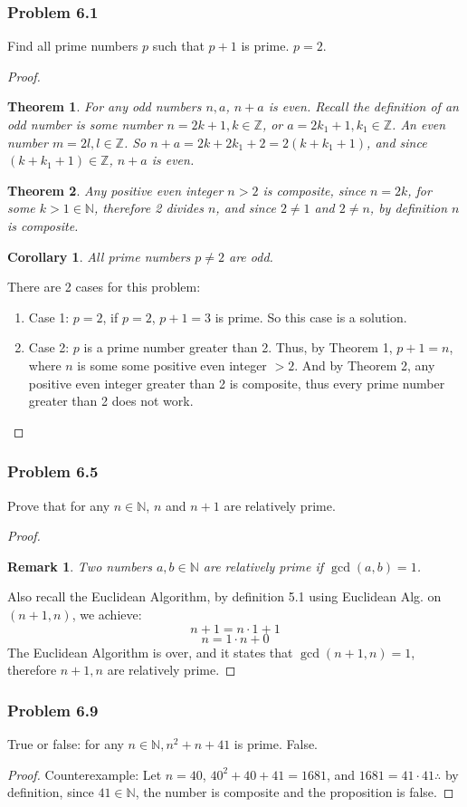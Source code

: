 \documentclass[hidelinks,12pt]{article}
\newtheorem{theorem}{Theorem}
\newtheorem{corollary}{Corollary}[theorem]
\newtheorem*{remark}{Remark}
\newcommand{\N}{\mathbb{N}}
\newcommand{\Z}{\mathbb{Z}}
\begin{document}
\subsubsection{Problem 6.1}
Find all prime numbers $p$ such that $p+1$ is prime.
\newline $p=2$.
\begin{proof}
\begin{theorem}
For any odd numbers $n,a$, $n+a$ is even. Recall the definition of an odd number is some number $n=2k+1,k\in\Z$, or $a=2k_1+1,k_1\in\Z$. An even number $m=2l,l\in\Z$. So $n+a=2k+2k_1+2=2(k+k_1+1)$, and since $(k+k_1+1)\in\Z$, $n+a$ is even.
\end{theorem}
\begin{theorem}
\label{thm2}
Any positive even integer $n>2$ is composite, since $n=2k$, for some $k>1\in\N$, therefore 2 divides $n$, and since $2\neq1$ and $2\neq n$, by definition $n$ is composite.
\end{theorem}
\begin{corollary}
All prime numbers $p\neq2$ are odd.
\end{corollary}
There are 2 cases for this problem:
\begin{enumerate}
    \item Case 1: $p=2$, if $p=2$, $p+1=3$ is prime. So this case is a solution.
    \item Case 2: $p$ is a prime number greater than 2. Thus, by Theorem 1, $p+1=n$, where $n$ is some some positive even integer $>2$. And by Theorem 2, any positive even integer greater than 2 is composite, thus every prime number greater than 2 does not work.
\end{enumerate}
\end{proof}
\subsubsection{Problem 6.5}
Prove that for any $n\in\N$, $n$ and $n+1$ are relatively prime.
\begin{proof}
\begin{remark}Two numbers $a,b\in\N$ are relatively prime if $\gcd(a,b)=1$.\end{remark}
Also recall the Euclidean Algorithm, by definition 5.1 using Euclidean Alg. on $(n+1,n)$, we achieve:$$n+1=n\cdot1+1$$ $$n=1\cdot n+0$$
The Euclidean Algorithm is over, and it states that $\gcd(n+1,n)=1$, therefore $n+1,n$ are relatively prime.
\end{proof}
\subsubsection{Problem 6.9}
True or false: for any $n\in\N, n^2+n+41$ is prime.
False.
\begin{proof}
Counterexample: Let $n=40$, $40^2+40+41=1681$, and $1681=41\cdot41 \therefore$ by definition, since $41\in\N$, the number is composite and the proposition is false.
\end{proof}
\newpage
\end{document}
